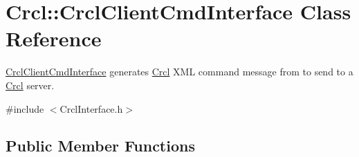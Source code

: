 \hypertarget{classCrcl_1_1CrclClientCmdInterface}{\section{Crcl\-:\-:Crcl\-Client\-Cmd\-Interface Class Reference}
\label{classCrcl_1_1CrclClientCmdInterface}
}


\hyperlink{classCrcl_1_1CrclClientCmdInterface}{Crcl\-Client\-Cmd\-Interface} generates \hyperlink{namespaceCrcl}{Crcl} X\-M\-L command message from to send to a \hyperlink{namespaceCrcl}{Crcl} server.  




{\ttfamily \#include $<$Crcl\-Interface.\-h$>$}

\subsection*{Public Member Functions}

